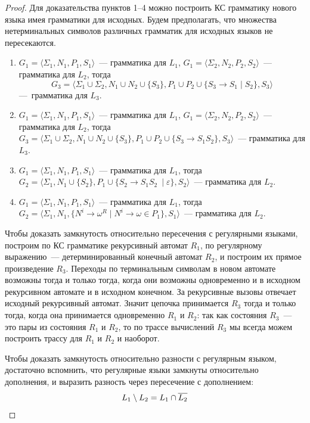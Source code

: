 \begin{proof}
    Для доказательства пунктов 1--4 можно построить КС грамматику нового языка имея грамматики для исходных.
    Будем предполагать, что множества нетерминальных символов различных грамматик для исходных языков не пересекаются.
    \begin{enumerate}
        \item $G_1=\langle\Sigma_1,N_1,P_1,S_1\rangle$~--- грамматика для $L_1$, $G_1=\langle\Sigma_2,N_2,P_2,S_2\rangle$~--- грамматика для $L_2$, тогда
              \[G_3=\langle\Sigma_1 \cup \Sigma_2, N_1 \cup N_2 \cup \{S_3\}, P_1 \cup P_2 \cup \{S_3 \to S_1 \mid S_2\} ,S_3\rangle\] ---~грамматика для $L_3$.
        \item $G_1=\langle\Sigma_1,N_1,P_1,S_1\rangle$~--- грамматика для $L_1$, $G_1=\langle\Sigma_2,N_2,P_2,S_2\rangle$~--- грамматика для $L_2$, тогда $G_3=\langle\Sigma_1 \cup \Sigma_2, N_1 \cup N_2 \cup \{S_3\}, P_1 \cup P_2 \cup \{S_3 \to S_1 S_2\} ,S_3\rangle$~--- грамматика для $L_3$.
        \item $G_1=\langle\Sigma_1,N_1,P_1,S_1\rangle$~--- грамматика для $L_1$, тогда $G_2=\langle\Sigma_1, N_1 \cup \{S_2\}, P_1 \cup \{S_2 \to S_1 S_2\ \mid \varepsilon\}, S_2\rangle$~--- грамматика для $L_2$.
        \item $G_1=\langle\Sigma_1,N_1,P_1,S_1\rangle$~--- грамматика для $L_1$, тогда $G_2=\langle\Sigma_1, N_1, \{N^i \to \omega^R \mid N^i \to \omega \in P_1 \}, S_1\rangle$~--- грамматика для $L_2$.
    \end{enumerate}

    Чтобы доказать замкнутость относительно пересечения с регулярными языками, построим по КС грамматике рекурсивный автомат $R_1$, по регулярному выражению~--- детерминированный конечный автомат $R_2$, и построим их прямое произведение $R_3$.
    Переходы по терминальным символам в новом автомате возможны тогда и только тогда, когда они возможны одновременно и в исходном рекурсивном автомате и в исходном конечном.
    За рекурсивные вызовы отвечает исходный рекурсивный автомат.
    Значит цепочка принимается $R_3$ тогда и только тогда, когда она принимается одновременно $R_1$ и $R_2$: так как состояния $R_3$~--- это пары из состояния $R_1$ и $R_2$, то по трассе вычислений $R_3$ мы всегда можем построить трассу для $R_1$ и $R_2$ и наоборот.

    Чтобы доказать замкнутость относительно разности с регулярным языком, достаточно вспомнить, что регулярные языки замкнуты относительно дополнения, и выразить разность через пересечение с дополнением:
    \[L_1 \setminus L_2 = L_1 \cap \overline{L_2} \qedhere\]
\end{proof}

